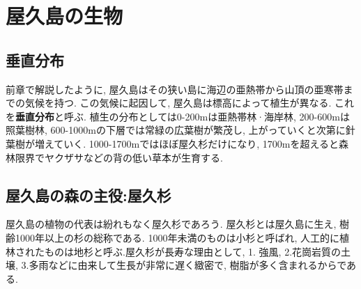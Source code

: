 \documentclass[10pt,titlepage,a5paper]{ltjsbook}
\begin{document}
\chapter{屋久島の生物}
\section{垂直分布}
  前章で解説したように, 屋久島はその狭い島に海辺の亜熱帯から山頂の亜寒帯までの気候を持つ. この気候に起因して, 屋久島は標高によって植生が異なる. これを\textbf{垂直分布}\footnotemark[6] と呼ぶ.
  植生の分布としては0-200mは亜熱帯林·海岸林, 200-600mは照葉樹林, 600-1000mの下層では常緑の広葉樹が繁茂し, 上がっていくと次第に針葉樹が増えていく. 1000-1700mではほぼ屋久杉だけになり, 1700mを超えると森林限界でヤクザサなどの背の低い草本が生育する. 
\section{屋久島の森の主役:屋久杉}
  屋久島の植物の代表は紛れもなく屋久杉であろう. 屋久杉とは屋久島に生え, 樹齢1000年以上の杉の総称である. 1000年未満のものは小杉と呼ばれ, 人工的に植林されたものは地杉と呼ぶ.屋久杉が長寿な理由として, 1. 強風, 2.花崗岩質の土壌, 3.多雨などに由来して生長が非常に遅く緻密で, 樹脂が多く含まれるからである. \\
\end{document}
